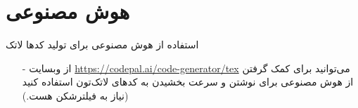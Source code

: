 \section{هوش مصنوعی}
\begin{frame}{استفاده از هوش مصنوعی برای تولید کد‌‌ها لاتک}
\begin{itemize}\itemr
\item[-]
از وبسایت 
\url{https://codepal.ai/code-generator/tex}
می‌توانید برای کمک گرفتن از هوش مصنوعی برای نوشتن و سرعت بخشیدن به کد‌های لاتک‌تون استفاده کنید (نیاز به فیلترشکن هست.)
\end{itemize}
\end{frame}